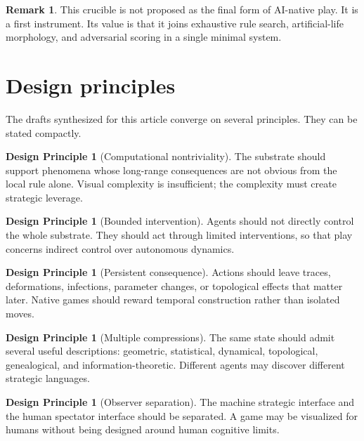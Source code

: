 \documentclass[11pt,a4paper]{article}
\theoremstyle{plain}
\theoremstyle{definition}
\newtheorem{principle}[theorem]{Design Principle}
\newtheorem{remark}[theorem]{Remark}
\begin{document}
\begin{remark}
This crucible is not proposed as the final form of AI-native play. It is a first instrument. Its value is that it joins exhaustive rule search, artificial-life morphology, and adversarial scoring in a single minimal system.
\end{remark}

\section{Design principles}\label{sec:principles}

The drafts synthesized for this article converge on several principles. They can be stated compactly.

\begin{principle}[Computational nontriviality]\label{prin:nontriviality}
The substrate should support phenomena whose long-range consequences are not obvious from the local rule alone. Visual complexity is insufficient; the complexity must create strategic leverage.
\end{principle}

\begin{principle}[Bounded intervention]\label{prin:bounded-intervention}
Agents should not directly control the whole substrate. They should act through limited interventions, so that play concerns indirect control over autonomous dynamics.
\end{principle}

\begin{principle}[Persistent consequence]\label{prin:persistent-consequence}
Actions should leave traces, deformations, infections, parameter changes, or topological effects that matter later. Native games should reward temporal construction rather than isolated moves.
\end{principle}

\begin{principle}[Multiple compressions]\label{prin:multiple-compressions}
The same state should admit several useful descriptions: geometric, statistical, dynamical, topological, genealogical, and information-theoretic. Different agents may discover different strategic languages.
\end{principle}

\begin{principle}[Observer separation]\label{prin:observer-separation}
The machine strategic interface and the human spectator interface should be separated. A game may be visualized for humans without being designed around human cognitive limits.
\end{principle}
\end{document}
